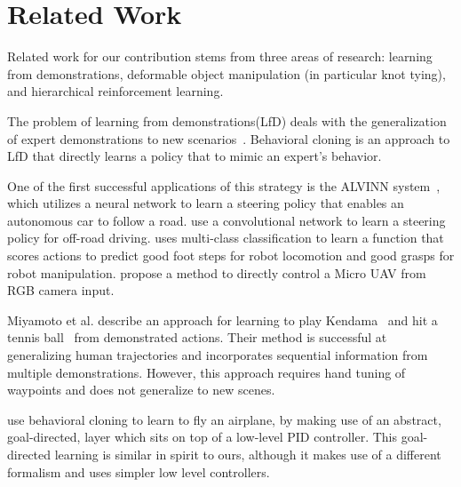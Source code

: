 \section{Related Work}


Related work for our contribution stems from three areas of research:
learning from demonstrations, deformable object manipulation (in particular
knot tying), and hierarchical reinforcement learning.

The problem of learning from demonstrations(LfD) deals with the generalization of expert demonstrations to 
new scenarios~\cite{Argall_2009, Schaal_1999}. Behavioral cloning is an approach to LfD that 
directly learns a policy that to mimic an expert's behavior.

One of the first successful applications of this strategy is the ALVINN system~\cite{Pomerleau_NIPS1989}, which utilizes a 
neural network to learn a steering policy that enables an autonomous car to follow a road.
\citet{muller2005off} use a convolutional network to learn a steering policy for off-road driving.
\citet{Ratliff_Humanoids2007} uses multi-class classification to learn a function that scores actions 
to predict good foot steps for robot locomotion and good grasps for robot manipulation.
\citet{Ross_2013} propose a method to directly control a Micro UAV from RGB camera input.

Miyamoto et al. describe an approach for learning to play Kendama~\cite{Miyamoto_1996} and hit a 
tennis ball~\cite{Miyamoto_1998} from demonstrated actions. 
Their method is successful at generalizing human trajectories and incorporates sequential information 
from multiple demonstrations.
However, this approach requires hand tuning of waypoints and does not generalize to new scenes.

\citet{Isaac_ICML2003} use behavioral cloning to learn to fly an airplane, by making use of an abstract, 
goal-directed, layer which sits on top of a low-level PID controller.
This goal-directed learning is similar in spirit to ours, although it makes use of a different formalism
and uses simpler low level controllers.

